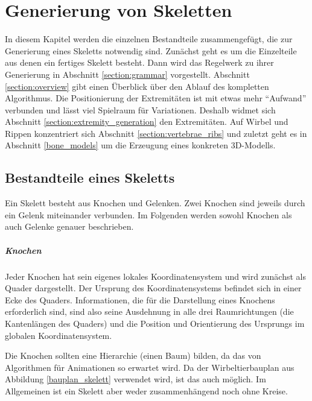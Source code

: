 \chapter{Generierung von Skeletten}
\label{chapter:skeleton_generation}

In diesem Kapitel werden die einzelnen Bestandteile zusammengefügt, die zur Generierung eines Skeletts notwendig sind. Zunächst geht es um die Einzelteile aus denen ein fertiges Skelett besteht. Dann wird das Regelwerk zu ihrer Generierung in Abschnitt \ref{section:grammar} vorgestellt. Abschnitt \ref{section:overview} gibt einen Überblick über den Ablauf des kompletten Algorithmus. Die Positionierung der Extremitäten ist mit etwas mehr "`Aufwand"' verbunden und lässt viel Spielraum für Variationen. Deshalb widmet sich Abschnitt \ref{section:extremity_generation} den Extremitäten. Auf Wirbel und Rippen konzentriert sich Abschnitt \ref{section:vertebrae_ribs} und zuletzt geht es in Abschnitt \ref{bone_models} um die Erzeugung eines konkreten 3D-Modells.


\section{Bestandteile eines Skeletts}
\label{skeleton_parts}

Ein Skelett besteht aus Knochen und Gelenken. Zwei Knochen sind jeweils durch ein Gelenk miteinander verbunden. Im Folgenden werden sowohl Knochen als auch Gelenke genauer beschrieben.

\paragraph{Knochen}
Jeder Knochen hat sein eigenes lokales Koordinatensystem und wird zunächst als Quader dargestellt. Der Ursprung des Koordinatensystems befindet sich in einer Ecke des Quaders.
Informationen, die für die Darstellung eines Knochens erforderlich sind, sind also
seine Ausdehnung in alle drei Raumrichtungen (die Kantenlängen des Quaders) und die Position und Orientierung des Ursprungs im globalen Koordinatensystem.

Die Knochen sollten eine Hierarchie (einen Baum) bilden, da das von Algorithmen für Animationen so erwartet wird.  Da der Wirbeltierbauplan aus Abbildung \ref{bauplan_skelett} verwendet wird, ist das auch möglich. Im Allgemeinen ist ein Skelett aber weder zusammenhängend noch ohne Kreise.

